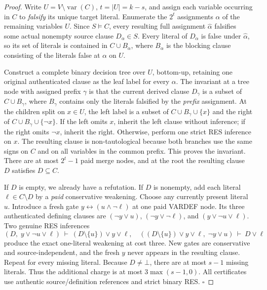 \documentclass[11pt]{article}
\begin{document}
\begin{proof}
Write $U=V\setminus\operatorname{var}(C)$, $t=|U|=k-s$, and assign each variable occurring in $C$ to \emph{falsify} its unique target literal. Enumerate the $2^t$ assignments $\alpha$ of the remaining variables $U$. Since $S\models C$, every resulting full assignment $\widehat\alpha$ falsifies some actual nonempty source clause $D_\alpha\in S$. Every literal of $D_\alpha$ is false under $\widehat\alpha$, so its set of literals is contained in $C\cup B_\alpha$, where $B_\alpha$ is the blocking clause consisting of the literals false at $\alpha$ on $U$.

Construct a complete binary decision tree over $U$, bottom-up, retaining one original authenticated clause as the leaf label for every $\alpha$. The invariant at a tree node with assigned prefix $\gamma$ is that the current derived clause $D_\gamma$ is a subset of $C\cup B_\gamma$, where $B_\gamma$ contains only the literals falsified by the \emph{prefix} assignment. At the children split on $x\in U$, the left label is a subset of $C\cup B_\gamma\cup\{x\}$ and the right of $C\cup B_\gamma\cup\{\neg x\}$. If the left omits $x$, inherit the left clause without inference; if the right omits $\neg x$, inherit the right. Otherwise, perform one strict RES inference on $x$. The resulting clause is non-tautological because both branches use the same signs on $C$ and on all variables in the common prefix. This proves the invariant. There are at most $2^t-1$ paid merge nodes, and at the root the resulting clause $D$ satisfies $D\subseteq C$.

If $D$ is empty, we already have a refutation. If $D$ is nonempty, add each literal $\ell\in C\setminus D$ by a \emph{paid} conservative weakening. Choose any currently present literal $u$. Introduce a fresh gate $y\leftrightarrow(u\land\neg\ell)$ at one paid VARDEF node. Its three authenticated defining clauses are $(\neg y\vee u)$, $(\neg y\vee\neg\ell)$, and $(y\vee\neg u\vee\ell)$. Two genuine RES inferences
\[
(D,\;y\vee\neg u\vee\ell)\ \vdash\ (D\setminus\{u\})\vee y\vee\ell,
\quad
((D\setminus\{u\})\vee y\vee\ell,\;\neg y\vee u)\ \vdash\ D\vee\ell
\]
produce the exact one-literal weakening at cost three. New gates are conservative and source-independent, and the fresh $y$ never appears in the resulting clause. Repeat for every missing literal. Because $D\ne\bot$, there are at most $s-1$ missing literals. Thus the additional charge is at most $3\max(s-1,0)$. All certificates use authentic source/definition references and strict binary RES. \hfill$\square$
\end{proof}
\end{document}
